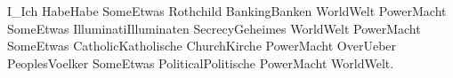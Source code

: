 I_Ich HabeHabe SomeEtwas Rothchild BankingBanken WorldWelt PowerMacht SomeEtwas IlluminatiIlluminaten SecrecyGeheimes WorldWelt PowerMacht SomeEtwas CatholicKatholische ChurchKirche PowerMacht OverUeber PeoplesVoelker SomeEtwas PoliticalPolitische PowerMacht WorldWelt.
